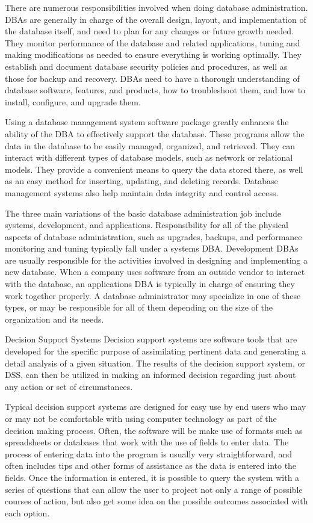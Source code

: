 There are numerous responsibilities involved when doing database administration. DBAs are generally in charge of the overall design, layout, and implementation of the database itself, and need to plan for any changes or future growth needed. They monitor performance of the database and related applications, tuning and making modifications as needed to ensure everything is working optimally. They establish and document database security policies and procedures, as well as those for backup and recovery. DBAs need to have a thorough understanding of database software, features, and products, how to troubleshoot them, and how to install, configure, and upgrade them.

Using a database management system software package greatly enhances the ability of the DBA to effectively support the database. These programs allow the data in the database to be easily managed, organized, and retrieved. They can interact with different types of database models, such as network or relational models. They provide a convenient means to query the data stored there, as well as an easy method for inserting, updating, and deleting records. Database management systems also help maintain data integrity and control access.

The three main variations of the basic database administration job include systems, development, and applications. Responsibility for all of the physical aspects of database administration, such as upgrades, backups, and performance monitoring and tuning typically fall under a systems DBA. Development DBAs are usually responsible for the activities involved in designing and implementing a new database. When a company uses software from an outside vendor to interact with the database, an applications DBA is typically in charge of ensuring they work together properly. A database administrator may specialize in one of these types, or may be responsible for all of them depending on the size of the organization and its needs.



Decision Support Systems
Decision support systems are software tools that are developed for the specific purpose of assimilating pertinent data and generating a detail analysis of a given situation. The results of the decision support system, or DSS, can then be utilized in making an informed decision regarding just about any action or set of circumstances.

Typical decision support systems are designed for easy use by end users who may or may not be comfortable with using computer technology as part of the decision making process. Often, the software will be make use of formats such as spreadsheets or databases that work with the use of fields to enter data. The process of entering data into the program is usually very straightforward, and often includes tips and other forms of assistance as the data is entered into the fields. Once the information is entered, it is possible to query the system with a series of questions that can allow the user to project not only a range of possible courses of action, but also get some idea on the possible outcomes associated with each option.

